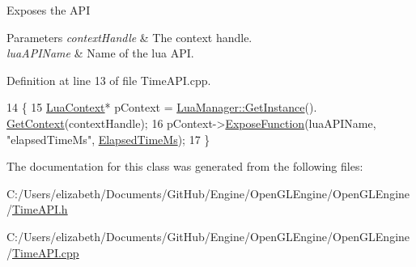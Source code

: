 Exposes the A\+PI 


\begin{DoxyParams}{Parameters}
{\em context\+Handle} & The context handle.\\
\hline
{\em lua\+A\+P\+I\+Name} & Name of the lua A\+PI.\\
\hline
\end{DoxyParams}


Definition at line 13 of file Time\+A\+P\+I.\+cpp.


\begin{DoxyCode}
14 \{
15     \hyperlink{class_lua_context}{LuaContext}* pContext = \hyperlink{class_singleton_a74f32751d99bf3cc95fe17aba11f4b07}{LuaManager::GetInstance}().
      \hyperlink{class_lua_manager_a68592b46a59219d130cf4f637c977378}{GetContext}(contextHandle);
16     pContext->\hyperlink{class_lua_context_a2229908b6b329ed67105f1be7409cb3f}{ExposeFunction}(luaAPIName, \textcolor{stringliteral}{"elapsedTimeMs"}, 
      \hyperlink{class_time_a_p_i_ac4462441fc5177c90da58e96c1b3f10d}{ElapsedTimeMs});
17 \}\end{DoxyCode}


The documentation for this class was generated from the following files\+:\begin{DoxyCompactItemize}
\item 
C\+:/\+Users/elizabeth/\+Documents/\+Git\+Hub/\+Engine/\+Open\+G\+L\+Engine/\+Open\+G\+L\+Engine/\hyperlink{_time_a_p_i_8h}{Time\+A\+P\+I.\+h}\item 
C\+:/\+Users/elizabeth/\+Documents/\+Git\+Hub/\+Engine/\+Open\+G\+L\+Engine/\+Open\+G\+L\+Engine/\hyperlink{_time_a_p_i_8cpp}{Time\+A\+P\+I.\+cpp}\end{DoxyCompactItemize}
